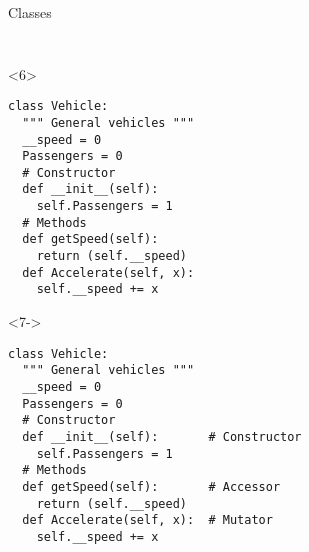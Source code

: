 \begin{frame}[fragile]{Classes}
\begin{columns}[onlytextwidth]
\begin{column}{\textwidth}
\begin{onlyenv}
\begin{lstlisting}[style=python]
 \end{lstlisting}
      \end{onlyenv}

      \begin{onlyenv}<6>
        \begin{lstlisting}[style=python]
class Vehicle:
  """ General vehicles """
  __speed = 0
  Passengers = 0
  # Constructor
  def __init__(self):
    self.Passengers = 1
  # Methods
  def getSpeed(self):
    return (self.__speed)
  def Accelerate(self, x):
    self.__speed += x \end{lstlisting}
      \end{onlyenv}


      \begin{onlyenv}<7->
        \begin{lstlisting}[style=python]
class Vehicle:
  """ General vehicles """
  __speed = 0
  Passengers = 0
  # Constructor
  def __init__(self):       # Constructor
    self.Passengers = 1
  # Methods
  def getSpeed(self):       # Accessor
    return (self.__speed)
  def Accelerate(self, x):  # Mutator
    self.__speed += x \end{lstlisting}
      \end{onlyenv}

    \end{column}
  \end{columns}

\end{frame}


